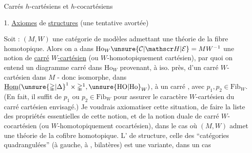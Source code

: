 Carrés $h$-cartésiens et $h$-cocartésiens


1. \uline{Axiomes} de \uline{structures} \uline{} (une tentative avortée)

Soit : $(M,W)$ une catégorie de modèles admettant une théorie de la fibre homotopique. Alors on a dans $\mathrm{Ho}_W\unsure{\mathcal C|\mathscr H|\mathcal E}=MW^{-1}$ une notion de \uline{carré} \uline{$W$-cartésien} (ou $W$-homotopiquement cartésien), par quoi on entend un diagramme carré
dans $\mathrm{Ho}_W$ provenant, à iso. près, d'un carré $W$-cartésien dans $M$ - donc  isomorphe, dans $\underline{\mathrm{Hom}}(\unsure{\mathbb{\Delta}|\Delta}^1\times\mathbb{\Delta}^1,\unsure{\mathrm{HO}|\mathrm{Ho}}_W)$, à un carré  
, avec $p_1,p_2\in\mathrm{Fib}_W$. (En fait, il suffit de $p_1$ ou $p_2\in\mathrm{Fib}_W$ pour assurer le caractère $W$-cartésien du carré cartésien envisagé.) Je voudrais axiomatiser
\margin{!}
cette situation,   de faire la liste des propriétés  essentielles de cette notion, et de la notion duale de carré $W$-cocartésien (ou $W$-homotopiquement cocartésien), dans le cas où $(M,W)$ admet une théorie de la cofibre homotopique. L' de structure,  celle des ``catégories quadrangulées'' (à gauche, à , bilatères) est une variante, dans un cas
